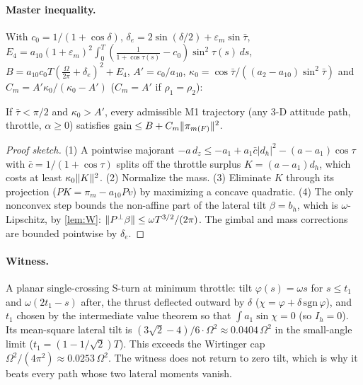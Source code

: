 \paragraph{Master inequality.} With $c_0=1/(1+\cos\delta)$, $\delta_e=2\sin(\delta/2)+\varepsilon_m\sin\bar\tau$,
$E_4=a_{10}(1+\varepsilon_m)^2\int_0^T(\frac1{1+\cos\tau(s)}-c_0)\sin^2\tau(s)\,ds$, $B=a_{10}c_0T(\frac\Omega{2\pi}+\delta_e)^2+E_4$,
$A'=c_0/a_{10}$, $\kappa_0=\cos\bar\tau/((a_2-a_{10})\sin^2\bar\tau)$ and $C_m=A'\kappa_0/(\kappa_0-A')$ ($C_m=A'$ if $\rho_1=\rho_2$):
\begin{proposition}\label{prop:master}
If $\bar\tau<\pi/2$ and $\kappa_0>A'$, every admissible M1 trajectory (any 3-D attitude path, throttle, $\alpha\ge0$) satisfies
$\mathrm{gain}\le B+C_m\lVert \pi_{m(F)}\rVert^2$.\Sproved\ 
\end{proposition}
\begin{proof}[Proof sketch]
(1) A pointwise majorant $-a\,d_z\le-a_1+a_1\bar c|d_h|^2-(a-a_1)\cos\tau$ with $\bar c=1/(1+\cos\tau)$ splits off the throttle surplus
$K=(a-a_1)d_h$, which costs at least $\kappa_0\lVert K\rVert^2$. (2) Normalize the mass. (3) Eliminate $K$ through its projection
($PK=\pi_m-a_{10}Pv$) by maximizing a concave quadratic. (4) The only nonconvex step bounds the non-affine part of the lateral tilt
$\beta=b_h$, which is $\omega$-Lipschitz, by \cref{lem:W}: $\lVert P^\perp\beta\rVert\le\omega T^{3/2}/(2\pi)$. The gimbal and mass corrections are
bounded pointwise by $\delta_e$.
\end{proof}

\paragraph{Witness.} A planar single-crossing S-turn at minimum throttle: tilt $\varphi(s)=\omega s$ for $s\le t_1$ and $\omega(2t_1-s)$
after, the thrust deflected outward by $\delta$ ($\chi=\varphi+\delta\,\mathrm{sgn}\,\varphi$), and $t_1$ chosen by the intermediate value
theorem so that $\int a_1\sin\chi=0$ (so $I_h=0$). Its mean-square lateral tilt is $(3\sqrt2-4)/6\cdot\Omega^2\approx0.0404\,\Omega^2$ in the
small-angle limit ($t_1=(1-1/\sqrt2)T$). This exceeds the Wirtinger cap $\Omega^2/(4\pi^2)\approx0.0253\,\Omega^2$. The witness does not return to
zero tilt, which is why it beats every path whose two lateral moments vanish.

